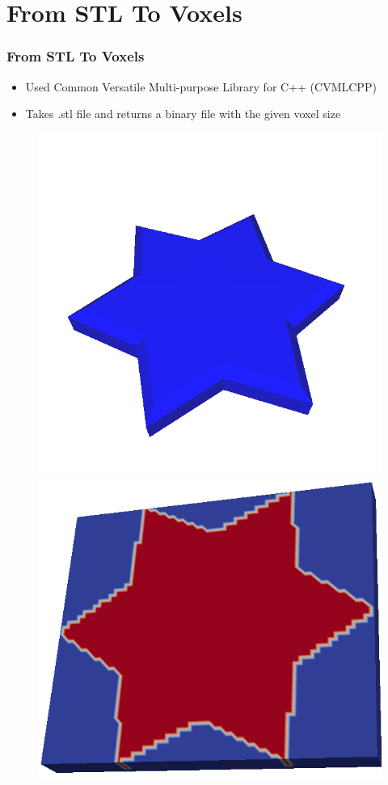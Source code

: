 \section{From STL To Voxels}
\begin{frame}
		\frametitle{From STL To Voxels}
		\begin{minipage}{0.85\textwidth}
			\begin{itemize}
			\item Used Common Versatile Multi-purpose Library for C++ (CVMLCPP)
			\item Takes .stl file and returns a binary file with the given voxel size
			\end{itemize}
			\centering
			\begin{figure}
			\includegraphics[scale=0.15]{Pictures/STLToVoxels/Star_STL.png}
			\includegraphics[scale=0.15]{Pictures/STLToVoxels/Star_VTK_Trans.png}

\end{figure}
\end{minipage}
\end{frame}
